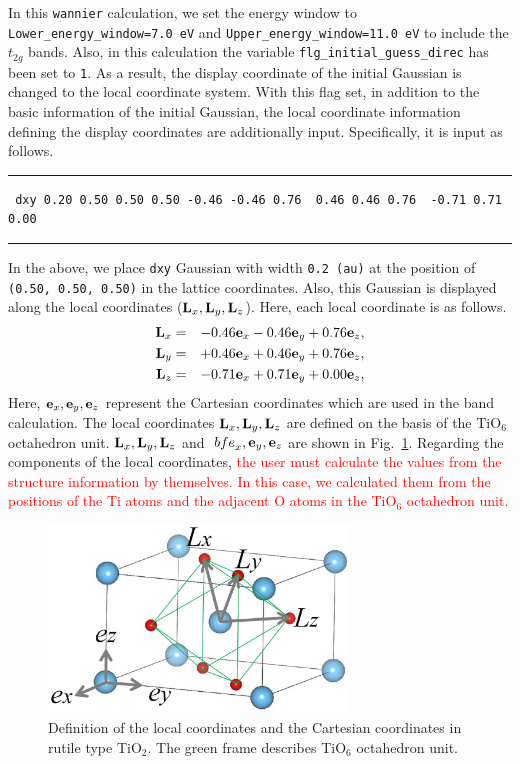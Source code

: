 \documentclass{article}
\newcommand{\tr}[1]{\textcolor{red}{#1}}
\begin{document}
In this \verb+wannier+ calculation, we set the energy window to \verb+Lower_energy_window=7.0 eV+ and  \verb+Upper_energy_window=11.0 eV+ to include the $t_{2 g}$ bands. Also, in this calculation the variable \verb+flg_initial_guess_direc+ has been set to \verb+1+. As a result, the display coordinate of the initial Gaussian is changed to the local coordinate system. With this flag set, in addition to the basic information of the initial Gaussian, the local coordinate information defining the display coordinates are additionally input. Specifically, it is input as follows.
\vspace{3mm}\hrule
\begin{verbatim}
 dxy 0.20 0.50 0.50 0.50 -0.46 -0.46 0.76  0.46 0.46 0.76  -0.71 0.71 0.00
\end{verbatim}
\hrule\vspace{3mm}
In the above, we place \verb+dxy+ Gaussian with width \verb+0.2 (au)+ at the position of \verb+(0.50, 0.50, 0.50)+ in the lattice coordinates. Also, this Gaussian is displayed along the local coordinates (${\bf L}_x, {\bf L}_y, {\bf L}_z$). Here, each local coordinate is as follows.
\begin{eqnarray} 
{\bf L}_x &=& -0.46 {\bf e}_x -0.46 {\bf e}_y + 0.76 {\bf e}_z, \nonumber \\
{\bf L}_y &=& +0.46 {\bf e}_x +0.46 {\bf e}_y + 0.76 {\bf e}_z, \nonumber \\
{\bf L}_z &=& -0.71 {\bf e}_x +0.71 {\bf e}_y + 0.00 {\bf e}_z, \nonumber 
\end{eqnarray} 
Here, ${\bf e}_x, {\bf e}_y, {\bf e}_z$ represent the Cartesian coordinates which are used in the band calculation. The local coordinates ${\bf L}_x, {\bf L}_y, {\bf L}_z$ are defined on the basis of the TiO$_6$ octahedron unit. ${\bf L}_x, {\bf L}_y, {\bf L}_z$ and ${\ bf e}_x, {\bf e}_y, {\bf e}_z$ are shown in Fig.~\ref{TiO2-local}. Regarding the components of the local coordinates, \tr{the user must calculate the values from the structure information by themselves. In this case, we calculated them from the positions of the Ti atoms and the adjacent O atoms in the TiO$_6$ octahedron unit.} 
\begin{figure}[H] 
\centering
\includegraphics[width=8cm]{TiO2-local.eps}
\caption{Definition of the local coordinates and the Cartesian coordinates in rutile type TiO$_2$. The green frame describes TiO$_6$ octahedron unit.}
\label{TiO2-local}
\end{figure}
\end{document}
